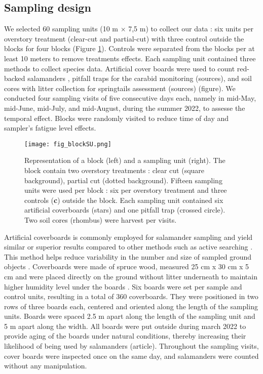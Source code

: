 \subsection*{Sampling design}
\label{subsec:sampling}

We selected 60 sampling units (10 m $\times$ 7,5 m) to collect our data : six units per overstory treatment (clear-cut and partial-cut) with three control outside the blocks for four blocks (Figure \ref*{fig:blockSU}).
Controls were separated from the blocks per at least 10 meters to remove treatments effects.
Each sampling unit contained three methods to collect species data. 
Artificial cover boards were used to count red-backed salamanders \citep{hesedUncoveringSalamanderEcology2012,mazerolleWoodlandSalamanderPopulation2021a,mooreComparisonPopulationEastern2009c}, 
pitfall traps for the carabid monitoring (sources), and soil cores with litter collection for springtails assessment (sources) (figure).
We conducted four sampling visits of five consecutive days each, namely in mid-May, mid-June, mid-July, and mid-August, during the summer 2022, to assesse the temporal effect. 
Blocks were randomly visited to reduce time of day and sampler's fatigue level effects.

\begin{figure}[ht!]
	\centering
	\texttt{[image: fig\_blockSU.png]}
	\caption[Representation of a block and a sampling unit]{
  Representation of a block (left) and a sampling unit (right). 
  The block contain two overstory treatments : clear cut (square background), partial cut (dotted background). 
  Fifteen sampling units were used per block : six per overstory treatment and three controls (\textbf{c}) outside the block.
  Each sampling unit contained six artificial coverboards (stars) and one pitfall trap (crossed circle). Two soil cores (rhombus) were harvest per visits.
  }
	\label{fig:blockSU}
	\end{figure}  

Artificial coverboards is commonly employed for salamander sampling and yield similar or superior results compared to other methods such as active searching \citep{hydeSamplingPlethodontidSalamanders2001,mooreComparisonPopulationEastern2009c}. 
This method helps reduce variability in the number and size of sampled ground objects \citep{hydeSamplingPlethodontidSalamanders2001}. 
Coverboards were made of spruce wood, measured 25 cm x 30 cm x 5 cm and were placed directly on the ground without litter underneath to maintain higher humidity level under the boards \citep{mazerolleWoodlandSalamanderPopulation2021a}. 
Six boards were set per sample and control units, resulting in a total of 360 coverboards.
They were positioned in two rows of three boards each, centered and oriented along the length of the sampling units.
Boards were spaced 2.5 m apart along the length of the sampling unit and 5 m apart along the width.
All boards were put outside during march 2022 to provide aging of the boards under natural conditions, thereby increasing their likelihood of being used by salamanders (article).
Throughout the sampling visits, cover boards were inspected once on the same day, and salamanders were counted without any manipulation.

